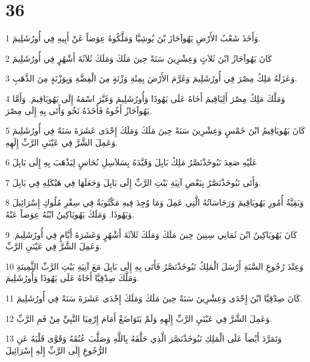 \chapter{36}

\par 1 وَأَخَذَ شَعْبُ الأَرْضِ يَهُوآحَازَ بْنَ يُوشِيَّا وَمَلَّكُوهُ عِوَضاً عَنْ أَبِيهِ فِي أُورُشَلِيمَ.
\par 2 كَانَ يَهُوآحَازُ ابْنَ ثَلاَثٍ وَعِشْرِينَ سَنَةً حِينَ مَلَكَ وَمَلَكَ ثَلاَثَةَ أَشْهُرٍ فِي أُورُشَلِيمَ
\par 3 وَعَزَلَهُ مَلِكُ مِصْرَ فِي أُورُشَلِيمَ وَغَرَّمَ الأَرْضَ بِمِئَةِ وَزْنَةٍ مِنَ الْفِضَّةِ وَبِوَزْنَةٍ مِنَ الذَّهَبِ.
\par 4 وَمَلَّكَ مَلِكُ مِصْرَ أَلِيَاقِيمَ أَخَاهُ عَلَى يَهُوذَا وَأُورُشَلِيمَ وَغَيَّرَ اسْمَهُ إِلَى يَهُويَاقِيمَ. وَأَمَّا يَهُوآحَازُ أَخُوهُ فَأَخَذَهُ نَخُو وَأَتَى بِهِ إِلَى مِصْرَ.
\par 5 كَانَ يَهُويَاقِيمُ ابْنَ خَمْسٍ وَعِشْرِينَ سَنَةً حِينَ مَلَكَ وَمَلَكَ إِحْدَى عَشَرَةَ سَنَةً فِي أُورُشَلِيمَ وَعَمِلَ الشَّرَّ فِي عَيْنَيِ الرَّبِّ إِلَهِهِ.
\par 6 عَلَيْهِ صَعِدَ نَبُوخَذْنَصَّرُ مَلِكُ بَابِلَ وَقَيَّدَهُ بِسَلاَسِلِ نُحَاسٍ لِيَذْهَبَ بِهِ إِلَى بَابِلَ
\par 7 وَأَتَى نَبُوخَذْنَصَّرُ بِبَعْضِ آنِيَةِ بَيْتِ الرَّبِّ إِلَى بَابِلَ وَجَعَلَهَا فِي هَيْكَلِهِ فِي بَابِلَ.
\par 8 وَبَقِيَّةُ أُمُورِ يَهُويَاقِيمَ وَرَجَاسَاتُهُ الَّتِي عَمِلَ وَمَا وُجِدَ فِيهِ مَكْتُوبَةٌ فِي سِفْرِ مُلُوكِ إِسْرَائِيلَ وَيَهُوذَا. وَمَلَكَ يَهُويَاكِينُ ابْنُهُ عِوَضاً عَنْهُ.
\par 9 كَانَ يَهُويَاكِينُ ابْنَ ثَمَانِي سِنِينَ حِينَ مَلَكَ وَمَلَكَ ثَلاَثَةَ أَشْهُرٍ وَعَشَرَةَ أَيَّامٍ فِي أُورُشَلِيمَ. وَعَمِلَ الشَّرَّ فِي عَيْنَيِ الرَّبِّ.
\par 10 وَعِنْدَ رُجُوعِ السَّنَةِ أَرْسَلَ الْمَلِكُ نَبُوخَذْنَصَّرُ فَأَتَى بِهِ إِلَى بَابِلَ مَعَ آنِيَةِ بَيْتِ الرَّبِّ الثَّمِينَةِ وَمَلَّكَ صِدْقِيَّا أَخَاهُ عَلَى يَهُوذَا وَأُورُشَلِيمَ.
\par 11 كَانَ صِدْقِيَّا ابْنَ إِحْدَى وَعِشْرِينَ سَنَةً حِينَ مَلَكَ وَمَلَكَ إِحْدَى عَشَرَةَ سَنَةً فِي أُورُشَلِيمَ.
\par 12 وَعَمِلَ الشَّرَّ فِي عَيْنَيِ الرَّبِّ إِلَهِهِ وَلَمْ يَتَوَاضَعْ أَمَامَ إِرْمِيَا النَّبِيِّ مِنْ فَمِ الرَّبِّ.
\par 13 وَتَمَرَّدَ أَيْضاً عَلَى الْمَلِكِ نَبُوخَذْنَصَّرَ الَّذِي حَلَّفَهُ بِاللَّهِ وَصَلَّبَ عُنُقَهُ وَقَوَّى قَلْبَهُ عَنِ الرُّجُوعِ إِلَى الرَّبِّ إِلَهِ إِسْرَائِيلَ
